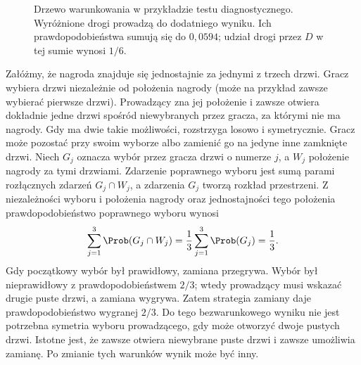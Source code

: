 \begin{figure}[htbp]
\centering
{}
\caption{Drzewo warunkowania w przykładzie testu diagnostycznego.
Wyróżnione drogi prowadzą do dodatniego wyniku.
Ich prawdopodobieństwa sumują się do $0{,}0594$;
udział drogi przez $D$ w tej sumie wynosi $1/6$.}
\label{fig:rp1-03-test-tree}
\end{figure}


\begin{przyklad}
Załóżmy, że nagroda znajduje się jednostajnie za jednymi z trzech drzwi.
Gracz wybiera drzwi niezależnie od położenia nagrody
(może na przykład zawsze wybierać pierwsze drzwi). Prowadzący zna jej
położenie i zawsze otwiera dokładnie jedne drzwi spośród
niewybranych przez gracza, za którymi nie ma nagrody.
Gdy ma dwie takie możliwości, rozstrzyga losowo i symetrycznie. Gracz może
pozostać przy swoim wyborze albo zamienić go na jedyne inne
zamknięte drzwi. Niech $G_j$ oznacza wybór przez gracza drzwi
o numerze $j$, a $W_j$ położenie nagrody za tymi drzwiami.
Zdarzenie poprawnego wyboru jest sumą parami rozłącznych
zdarzeń $G_j\cap W_j$, a zdarzenia $G_j$ tworzą rozkład
przestrzeni. Z niezależności
wyboru i położenia nagrody oraz jednostajności tego położenia
prawdopodobieństwo poprawnego wyboru wynosi
\[
\sum_{j=1}^3\Prob(G_j\cap W_j)
=\frac13\sum_{j=1}^3\Prob(G_j)=\frac13.
\]
Gdy początkowy wybór był prawidłowy, zamiana przegrywa. Wybór był nieprawidłowy z prawdopodobieństwem
$2/3$; wtedy prowadzący musi wskazać drugie puste drzwi, a zamiana
wygrywa. Zatem strategia zamiany daje prawdopodobieństwo wygranej $2/3$.
Do tego bezwarunkowego wyniku nie jest potrzebna symetria wyboru
prowadzącego, gdy może otworzyć dwoje pustych drzwi. Istotne jest,
że zawsze otwiera niewybrane puste drzwi i zawsze umożliwia zamianę.
Po zmianie tych warunków wynik może być inny.
\end{przyklad}

